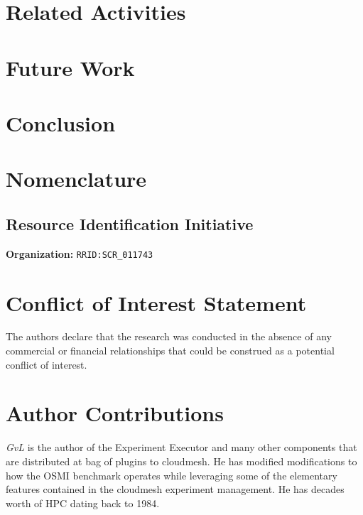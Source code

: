 \documentclass[utf8]{FrontiersinVancouver} %
\begin{document}
\section{Related Activities}


\section{Future Work}


\section{Conclusion}



\clearpage

\section{Nomenclature}

\subsection{Resource Identification Initiative}

{\bf Organization:} \verb|RRID:SCR_011743|

\section*{Conflict of Interest Statement}

The authors declare that the research was conducted in the absence of any commercial or financial relationships that could be construed as a potential conflict of interest.

\section*{Author Contributions}

{\em GvL} is the author of the Experiment Executor and many other components that are distributed at bag of plugins to cloudmesh.  He has modified modifications to how the OSMI benchmark operates while leveraging some of the elementary features contained in the cloudmesh experiment management. He has decades worth of HPC dating back to 1984. 
\end{document}
